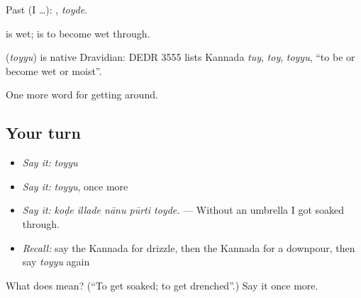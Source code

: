 Past (I …): , \emph{toyde}.

 is wet;  is to become wet through.

\begin{cousinweb}
\textbf{} (\emph{toyyu}) is native Dravidian: DEDR 3555 lists Kannada \emph{tuy}, \emph{toy}, \emph{toyyu}, \textquotedblleft{}to be or become wet or moist\textquotedblright{}.
\end{cousinweb}

\begin{grammarlens}[title={What you've built}]
One more word for getting around.
\end{grammarlens}

\subsection*{Your turn}
\begin{itemize}
\raggedright
  \item \emph{Say it:} \emph{toyyu}
  \item \emph{Say it:} \emph{toyyu}, once more
  \item \emph{Say it:} \emph{koḍe illade nānu pūrti toyde.} — Without an umbrella I got soaked through.
  \item \emph{Recall:} say the Kannada for drizzle, then the Kannada for a downpour, then say \emph{toyyu} again
\end{itemize}

\begin{tcolorbox}[breakable,colback=teal!4,colframe=teal!35!black,title={Before you move on}]
What does  mean? (\textquotedblleft{}To get soaked; to get drenched\textquotedblright{}.) Say it once more.
\end{tcolorbox}
